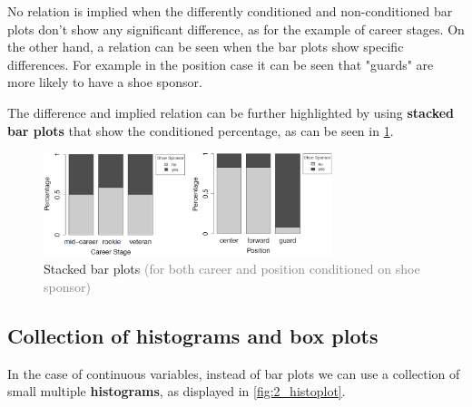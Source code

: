 No relation is implied when the differently conditioned and non-conditioned bar plots don't show any significant difference, as for the example of career stages. On the other hand, a relation can be seen when the bar plots show specific differences. For example in the position case it can be seen that "guards" are more likely to have a shoe sponsor.

The difference and implied relation can be further highlighted by using \textbf{stacked bar plots} that show the conditioned percentage, as can be seen in \ref{fig:2_barplot_stack}.

\begin{figure}[H]
  \centering
  \includegraphics[width=0.75\textwidth]{assets/visualization_and_extraction/feature_relation/bar_stacked.png}
  \caption{Stacked bar plots \textcolor{gray}{\footnotesize (for both career and position conditioned on shoe sponsor)}}
  \label{fig:2_barplot_stack}
\end{figure}

\subsection*{Collection of histograms and box plots}

In the case of continuous variables, instead of bar plots we can use a collection of small multiple \textbf{histograms}, as displayed in \ref{fig:2_histoplot}.

